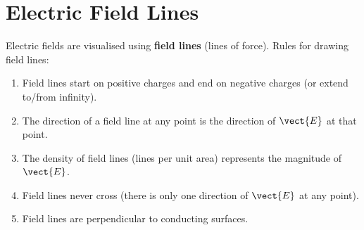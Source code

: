 \section{Electric Field Lines}

Electric fields are visualised using \textbf{field
lines} (lines of force). Rules for drawing field lines:
\begin{enumerate}[noitemsep]
  \item Field lines start on positive charges and
  end on negative charges (or extend to/from infinity).
  \item The direction of a field line at any point is
  the direction of $\vect{E}$ at that point.
  \item The density of field lines (lines per unit
  area) represents the magnitude of $\vect{E}$.
  \item Field lines never cross (there is only one
  direction of $\vect{E}$ at any point).
  \item Field lines are perpendicular to conducting
  surfaces.
\end{enumerate}

